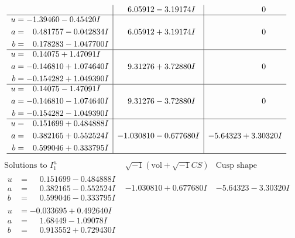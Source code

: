 \documentclass[1p]{elsarticle_modified}
\theoremstyle{definition}
\newcommand{\I}{\sqrt{-1}}
\begin{document}
$$\begin{array}{c|c|c}
 & \phantom{-}6.05912 - 3.19174 I & \phantom{-0.000000 } 0 \\ \hline\begin{aligned}
u &= -1.39460 - 0.45420 I \\
a &= \phantom{-}0.481757 - 0.042834 I \\
b &= \phantom{-}0.178283 - 1.047700 I\end{aligned}
 & \phantom{-}6.05912 + 3.19174 I & \phantom{-0.000000 } 0 \\ \hline\begin{aligned}
u &= \phantom{-}0.14075 + 1.47091 I \\
a &= -0.146810 + 1.074640 I \\
b &= -0.154282 + 1.049390 I\end{aligned}
 & \phantom{-}9.31276 + 3.72880 I & \phantom{-0.000000 } 0 \\ \hline\begin{aligned}
u &= \phantom{-}0.14075 - 1.47091 I \\
a &= -0.146810 - 1.074640 I \\
b &= -0.154282 - 1.049390 I\end{aligned}
 & \phantom{-}9.31276 - 3.72880 I & \phantom{-0.000000 } 0 \\ \hline\begin{aligned}
u &= \phantom{-}0.151699 + 0.484888 I \\
a &= \phantom{-}0.382165 + 0.552524 I \\
b &= \phantom{-}0.599046 + 0.333795 I\end{aligned}
 & -1.030810 - 0.677680 I & -5.64323 + 3.30320 I\\
 \hline 
 \end{array}$$\newpage$$\begin{array}{c|c|c}  
\text{Solutions to }I^u_{1}& \I (\text{vol} + \sqrt{-1}CS) & \text{Cusp shape}\\
 \hline 
\begin{aligned}
u &= \phantom{-}0.151699 - 0.484888 I \\
a &= \phantom{-}0.382165 - 0.552524 I \\
b &= \phantom{-}0.599046 - 0.333795 I\end{aligned}
 & -1.030810 + 0.677680 I & -5.64323 - 3.30320 I \\ \hline\begin{aligned}
u &= -0.033695 + 0.492640 I \\
a &= \phantom{-}1.68449 - 1.09078 I \\
b &= \phantom{-}0.913552 + 0.729430 I\end{aligned}

\end{array}$$
\end{document}
